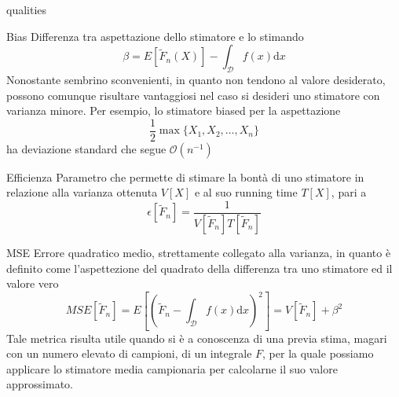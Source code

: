 \begin{altDescription}{qualities}
	\item[Bias] Differenza tra aspettazione dello stimatore e lo stimando
		\begin{equation}
			\beta = E[\tilde{F}_n(X)]-\int_{\mathcal{D}}f(x)\mathrm{d}x
		\end{equation}
		Nonostante sembrino sconvenienti, in quanto non tendono al valore desiderato, possono comunque risultare vantaggiosi nel caso si desideri uno
		stimatore con varianza minore. Per esempio, lo stimatore biased per la aspettazione
		\begin{equation}
			\frac{1}{2}\max\{X_1,X_2,\ldots,X_n\}
		\end{equation}
		ha deviazione standard che segue \mbox{$\mathcal{O}\left(n^{-1}\right)$}
	\item[Efficienza] Parametro che permette di stimare la bont\`a di uno stimatore in relazione alla varianza ottenuta $V[X]$ e al suo running time
		$T[X]$, pari a 
		\begin{equation}\label{chapter6:MC:efficiency}
			\epsilon[\tilde{F}_n]=\frac{1}{V[\tilde{F}_n]T[\tilde{F}_n]}
		\end{equation}
	\item[MSE] Errore quadratico medio, strettamente collegato alla varianza, in quanto \`e definito come l'aspettezione del quadrato della 
		differenza tra uno stimatore ed il valore vero
		\begin{equation}
			MSE[\tilde{F}_n]=E\left[\left(\tilde{F}_n-\int_{\mathcal{D}}f(x)\mathrm{d}x\right)^2\right]=V[\tilde{F}_n]+\beta^2
		\end{equation}
		Tale metrica risulta utile quando si \`e a conoscenza di una previa stima, magari con un numero elevato di campioni, di un integrale $F$,
		per la quale possiamo applicare lo stimatore media campionaria per calcolarne il suo valore approssimato.
\end{altDescription}
